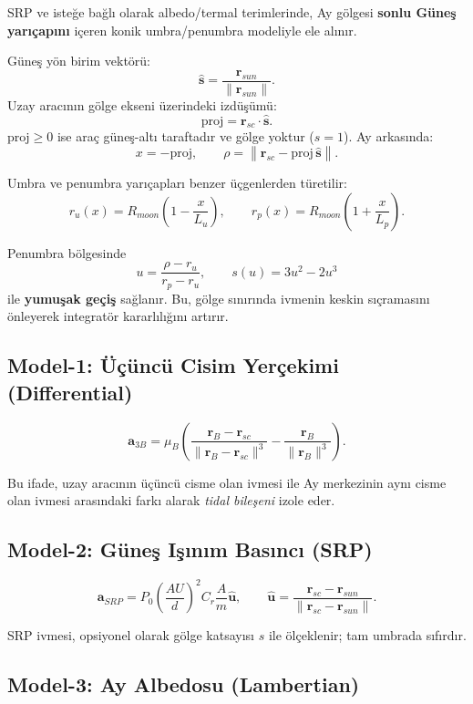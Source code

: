 SRP ve isteğe bağlı olarak albedo/termal terimlerinde,
Ay gölgesi \textbf{sonlu Güneş yarıçapını} içeren
konik umbra/penumbra modeliyle ele alınır.

Güneş yön birim vektörü:
\[
\hat{\mathbf{s}}=\frac{\mathbf{r}_{sun}}{\|\mathbf{r}_{sun}\|}.
\]
Uzay aracının gölge ekseni üzerindeki izdüşümü:
\[
\mathrm{proj}=\mathbf{r}_{sc}\cdot\hat{\mathbf{s}}.
\]
$\mathrm{proj}\ge 0$ ise araç güneş-altı taraftadır ve gölge yoktur ($s=1$).
Ay arkasında:
\[
x=-\mathrm{proj},\qquad
\rho=\left\|\mathbf{r}_{sc}-\mathrm{proj}\,\hat{\mathbf{s}}\right\|.
\]

Umbra ve penumbra yarıçapları benzer üçgenlerden türetilir:
\[
r_u(x)=R_{moon}\left(1-\frac{x}{L_u}\right),\qquad
r_p(x)=R_{moon}\left(1+\frac{x}{L_p}\right).
\]

Penumbra bölgesinde
\[
u=\frac{\rho-r_u}{r_p-r_u},\qquad
s(u)=3u^2-2u^3
\]
ile \textbf{yumuşak geçiş} sağlanır.
Bu, gölge sınırında ivmenin keskin sıçramasını önleyerek
integratör kararlılığını artırır.


\subsection*{Model-1: Üçüncü Cisim Yerçekimi (Differential)}

\[
\mathbf{a}_{3B}=
\mu_B\left(
\frac{\mathbf{r}_B-\mathbf{r}_{sc}}{\|\mathbf{r}_B-\mathbf{r}_{sc}\|^3}
-
\frac{\mathbf{r}_B}{\|\mathbf{r}_B\|^3}
\right).
\]

Bu ifade, uzay aracının üçüncü cisme olan ivmesi ile
Ay merkezinin aynı cisme olan ivmesi arasındaki farkı alarak
\emph{tidal bileşeni} izole eder.

\subsection*{Model-2: Güneş Işınım Basıncı (SRP)}

\[
\mathbf{a}_{SRP}
=
P_0\left(\frac{AU}{d}\right)^2
C_r\frac{A}{m}\hat{\mathbf{u}},
\qquad
\hat{\mathbf{u}}=\frac{\mathbf{r}_{sc}-\mathbf{r}_{sun}}{\|\mathbf{r}_{sc}-\mathbf{r}_{sun}\|}.
\]

SRP ivmesi, opsiyonel olarak gölge katsayısı $s$ ile ölçeklenir;
tam umbrada sıfırdır.

\subsection*{Model-3: Ay Albedosu (Lambertian)}

